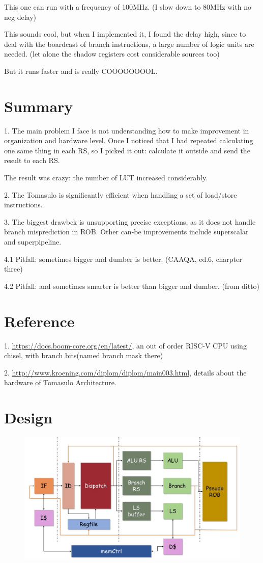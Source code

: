\documentclass[12pt,letterpaper]{article}
\begin{document}
    This one can run with a frequency of 100MHz. (I slow down to 80MHz with no neg delay)

    This sounds cool, but when I implemented it, I found the delay high, since to deal with the boardcast of branch instructions, 
    a large number of logic units are needed. (let alone the shadow registers cost considerable sources too)

    But it runs faster and is really COOOOOOOOL. 
\section{Summary}
    1. The main problem I face is not understanding how to make improvement in organization and hardware level. 
    Once I noticed that I had repeated calculating one same thing in each RS, so I picked it out: 
    calculate it outside and send the result to each RS. 

    The result was crazy: the number of LUT increased considerably. 

    2. The Tomasulo is significantly efficient when handling a set of load/store instructions. 

    3. The biggest drawbck is unsupporting precise exceptions, as it does not handle branch misprediction in ROB. 
    Other can-be improvements include superscalar and superpipeline. 

    4.1 Pitfall: sometimes bigger and dumber is better. (CAAQA, ed.6, charpter three)

    4.2 Pitfall: and sometimes smarter is better than bigger and dumber. (from ditto)
\section{Reference}
1. \url{https://docs.boom-core.org/en/latest/}, an out of order RISC-V CPU using chisel, with branch bits(named branch mask there)

2. \url{http://www.kroening.com/diplom/diplom/main003.html}, details about the hardware of Tomasulo Architecture.
\section{Design}
\begin{figure}[H]
    \centering
    \includegraphics[width=165mm]{design.jpg}
\end{figure}
\end{document}
